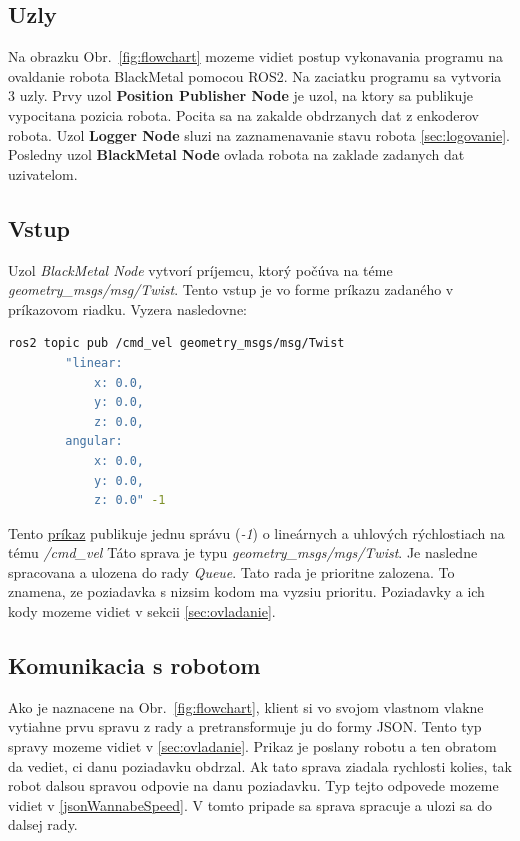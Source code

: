 \subsection{Uzly}

Na obrazku Obr.~\ref{fig:flowchart} mozeme vidiet postup vykonavania programu na ovaldanie robota BlackMetal pomocou ROS2.
Na zaciatku programu sa vytvoria 3 uzly. Prvy uzol \textbf{Position Publisher Node} je uzol, na ktory sa publikuje vypocitana pozicia robota.
Pocita sa na zakalde obdrzanych dat z enkoderov robota. Uzol \textbf{Logger Node} sluzi na zaznamenavanie stavu robota \ref{sec:logovanie}.
Posledny uzol \textbf{BlackMetal Node} ovlada robota na zaklade zadanych dat uzivatelom.

\subsection{Vstup}

Uzol \textit{BlackMetal Node} vytvorí príjemcu, ktorý počúva na téme \textit{geometry\_msgs/msg/Twist}. Tento vstup je vo forme príkazu
zadaného v príkazovom riadku. Vyzera nasledovne:


\label{requestCommand}
\begin{lstlisting}[language=bash]
	ros2 topic pub /cmd_vel geometry_msgs/msg/Twist
		"linear:
			x: 0.0,
			y: 0.0,
			z: 0.0,
		angular:
			x: 0.0,
			y: 0.0,
			z: 0.0" -1
\end{lstlisting}

Tento \hyperref[requestCommand]{príkaz} publikuje jednu správu (\textit{-1}) o lineárnych a uhlových rýchlostiach na tému \textit{/cmd\_vel}
Táto sprava je typu \textit{geometry\_msgs/mgs/Twist}. Je nasledne spracovana a ulozena do rady \textit{Queue}. Tato rada je prioritne zalozena.
To znamena, ze poziadavka s nizsim kodom ma vyzsiu prioritu. Poziadavky a ich kody mozeme vidiet v sekcii \ref{sec:ovladanie}.

\subsection{Komunikacia s robotom}
\label{sec:robotComms}

Ako je naznacene na Obr.~\ref{fig:flowchart}, klient si vo svojom vlastnom vlakne vytiahne prvu spravu z rady a pretransformuje ju do formy JSON.
Tento typ spravy mozeme vidiet v \ref{sec:ovladanie}. Prikaz je poslany robotu a ten obratom da vediet, ci danu poziadavku obdrzal. Ak tato sprava
ziadala rychlosti kolies, tak robot dalsou spravou odpovie na danu poziadavku. Typ tejto odpovede mozeme vidiet v \ref{jsonWannabeSpeed}. V tomto pripade
sa sprava spracuje a ulozi sa do dalsej rady.

